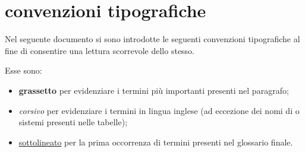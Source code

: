 %
%
\section[Convenzioni tipografiche]{convenzioni tipografiche}
\label{abs-hightlighting}
Nel seguente documento si sono introdotte le seguenti convenzioni tipografiche al fine di consentire una lettura scorrevole dello stesso.

Esse sono:

\begin{itemize}
\item{\textbf{grassetto} per evidenziare i termini più importanti presenti nel paragrafo;}
\item{\textit{corsivo} per evidenziare i termini in lingua inglese (ad eccezione dei nomi di  o sistemi presenti nelle tabelle);}
\item{\underline{sottolineato} per la prima occorrenza di termini presenti nel glossario finale.}
\end{itemize}